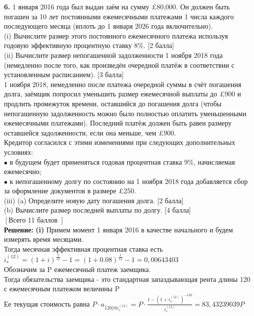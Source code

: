 \documentclass{article}
\begin{document}
{\bf \large 6.} 1 января 2016 года был выдан заём на сумму \pounds 80,000. Он должен быть погашен за 10 лет постоянными ежемесячными платежами 1 числа каждого последующего месяца (вплоть до 1 января 2026 года включительно).\\
(i) Вычислите размер этого постоянного ежемесячного платежа используя годовую эффективную процентную ставку 8\%. [2 балла]\\
(ii) Вычислите размер непогашенной задолженности 1 ноября 2018 года (немедленно после того, как произведён очередной платёж в соответствии с установленным расписанием). [3 балла]\\
1 ноября 2018, немедленно после платежа очередной суммы в счёт погашения долга, заёмщик попросил уменьшить размер ежемесячной выплаты до £900 и продлить промежуток времени, оставшийся до погашения долга (чтобы непогашенную задолженность можно было полностью оплатить уменьшенными ежемесячными платежами). Последний платёж должен быть равен размеру оставшейся задолженности, если она меньше, чем \pounds 900.\\
Кредитор согласился с этими изменениями при следующих дополнительных условиях:\\
$\bullet$ в будущем будет применяться годовая процентная ставка 9\%, начисляемая ежемесячно;\\
$\bullet $ к непогашенному долгу по состоянию на 1 ноября 2018 года добавляется сбор за оформление документов в размере \pounds 250.\\
(iii) (a) Определите новую дату погашения долга. [2 балла]\\
(b) Вычислите размер последней выплаты по долгу. [4 балла]\\
$\left[\right. $Всего 11 баллов $\left.\right]$\\

{ \bf \large Решение:}
{\bf \large  (i)}  Примем момент 1 января 2016 в качестве начального и будем измерять время месяцами. \\
Тогда месячная эффективная процентная ставка есть $i_{*}^{(12)} = (1+i)^{\frac {1}{12}} - 1 =  (1+0.08)^{\frac {1}{12}} - 1 = 0,00643403$\\
Обозначим за P ежемесячный платеж заемщика.\\
Тогда обязательства заемщика - это стандартная запаздывающая  рента длины 120 с ежемесячным платежом величины P\\
Ее текущая стоимость равна $P  \cdot a_{\overset{-}120 | @  i_{*}^{(12)}}  = P \cdot \frac { 1 - (1+i_{*}^{(12)})^{-120} }{i_{*}^{(12)}}  = 83,43239039P $\\
\end{document}
